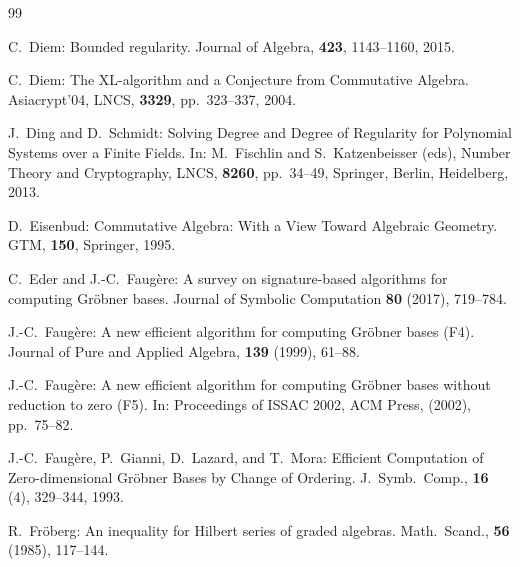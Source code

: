 \documentclass{article}
\theoremstyle{definition}
\theoremstyle{plain}
\theoremstyle{plain}
\theoremstyle{plain}
\theoremstyle{plain}
\numberwithin{equation}{subsection}
\begin{document}
\begin{thebibliography}{99}

C.\ Diem:
Bounded regularity.
Journal of Algebra, {\bf 423}, 1143--1160, 2015.

C.\ Diem:
The XL-algorithm and a Conjecture from Commutative Algebra.
Asiacrypt'04, LNCS, {\bf 3329}, pp.\ 323--337, 2004.

J.\ Ding and D.\ Schmidt:
Solving Degree and Degree of Regularity for Polynomial Systems over a Finite Fields.
In: M.\ Fischlin and S.\ Katzenbeisser (eds), Number Theory and Cryptography,
LNCS, {\bf 8260}, pp.\ 34--49, Springer, Berlin, Heidelberg, 2013.%


D.\ Eisenbud:
Commutative Algebra: With a View Toward Algebraic Geometry.
GTM, {\bf 150}, Springer, 1995.


C.\ Eder and J.-C.\ Faug\`{e}re:
A survey on signature-based algorithms for computing Gr\"obner bases.
Journal of Symbolic Computation {\bf 80} (2017), 719--784.

J.-C.\ Faug\`{e}re:
A new efficient algorithm for computing Gr\"{o}bner bases (F4).
Journal of Pure and Applied Algebra, {\bf 139} (1999), 61--88.

J.-C.\ Faug\`{e}re:
A new efficient algorithm for computing Gr\"{o}bner bases 
without reduction to zero (F5).
In: Proceedings of ISSAC 2002, ACM Press, (2002), pp.\ 75--82.

J.-C.\ Faug\`{e}re, P.\ Gianni, D.\ Lazard, and T.\ Mora:
Efficient Computation of Zero-dimensional Gr\"{o}bner Bases by Change of Ordering.
J.\ Symb.\ Comp., {\bf 16} (4), 329--344, 1993. 

R.\ Fr\"{o}berg:
An inequality for Hilbert series of graded algebras.
Math.\ Scand., {\bf 56} (1985), 117--144.


\end{thebibliography}
\end{document}
